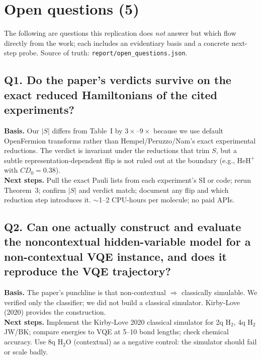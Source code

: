 \section{Open questions (5)}

The following are questions this replication does \emph{not} answer but
which flow directly from the work; each includes an evidentiary basis
and a concrete next-step probe. Source of truth:
\texttt{report/open\_questions.json}.

\subsection*{Q1. Do the paper's verdicts survive on the exact reduced Hamiltonians of the cited experiments?}
\textbf{Basis.} Our $|S|$ differs from Table~I by $3{\times}$--$9{\times}$
because we use default OpenFermion transforms rather than Hempel/Peruzzo/Nam's
exact experimental reductions. The verdict is invariant under the reductions
that trim $S$, but a subtle representation-dependent flip is not ruled out
at the boundary (e.g., $\mathrm{HeH}^+$ with $CD_0{=}0.38$).\\
\textbf{Next steps.} Pull the exact Pauli lists from each experiment's SI
or code; rerun Theorem~3; confirm $|S|$ and verdict match; document any
flip and which reduction step introduces it. $\sim$1--2 CPU-hours per
molecule; no paid APIs.

\subsection*{Q2. Can one actually construct and evaluate the noncontextual hidden-variable model for a non-contextual VQE instance, and does it reproduce the VQE trajectory?}
\textbf{Basis.} The paper's punchline is that non-contextual $\Rightarrow$
classically simulable. We verified only the classifier; we did not build a
classical simulator. Kirby-Love (2020) provides the construction.\\
\textbf{Next steps.} Implement the Kirby-Love 2020 classical simulator for
2q $\mathrm{H}_2$, 4q $\mathrm{H}_2$ JW/BK; compare energies to VQE at 5--10
bond lengths; check chemical accuracy. Use 8q $\mathrm{H}_2\mathrm{O}$
(contextual) as a negative control: the simulator should fail or scale badly.

